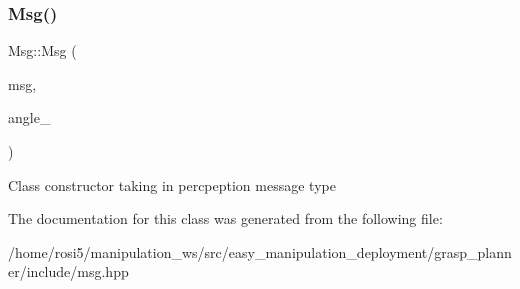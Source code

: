 \subsubsection{\texorpdfstring{Msg()}{Msg()}}
{\footnotesize\ttfamily Msg\+::\+Msg (\begin{DoxyParamCaption}\item[{const custom\+\_\+msgs\+::msg\+::\+Rect\+Output\+::\+Shared\+Ptr}]{msg,  }\item[{std\+::vector$<$ float $>$}]{angle\+\_\+ }\end{DoxyParamCaption})\hspace{0.3cm}{\ttfamily [inline]}}

Class constructor taking in percpeption message type 

The documentation for this class was generated from the following file\+:\begin{DoxyCompactItemize}
\item 
/home/rosi5/manipulation\+\_\+ws/src/easy\+\_\+manipulation\+\_\+deployment/grasp\+\_\+planner/include/msg.\+hpp\end{DoxyCompactItemize}
